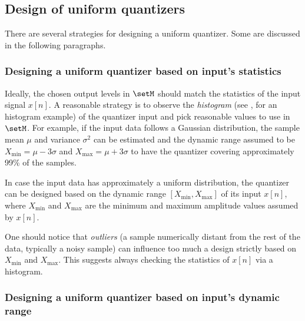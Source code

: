 
\subsection{Design of uniform quantizers}

There are several strategies for designing a uniform quantizer. Some are discussed in the following paragraphs.

\subsubsection{Designing a uniform quantizer based on input's statistics}

Ideally, the chosen output levels in $\setM$ should match
the statistics of the input signal $x[n]$.
A reasonable strategy is to observe the \emph{histogram} (see , for an histogram example) of the quantizer input and pick reasonable values to use in $\setM$.
For example, if the input data follows a Gaussian distribution, the sample mean $\mu$ and variance $\sigma^2$ can be estimated and the dynamic range assumed to be $X_{\textrm{min}}=\mu - 3 \sigma$ and $X_{\textrm{max}}= \mu + 3 \sigma$ to have the quantizer covering approximately 99\% of the samples.

In case the input data has approximately a uniform distribution, the quantizer can be designed based on the dynamic range $[X_{\textrm{min}}, X_{\textrm{max}}]$ of its input $x[n]$, where $X_{\textrm{min}}$ and $X_{\textrm{max}}$ are the minimum and maximum amplitude values assumed by $x[n]$.

One should notice that \emph{outliers} (a sample numerically distant from the rest of the data, typically a noisy sample) can influence too much a design strictly based on $X_{\textrm{min}}$ and $X_{\textrm{max}}$. This suggests always checking the statistics of $x[n]$ via a histogram.


\subsubsection{Designing a uniform quantizer based on input's dynamic range}


